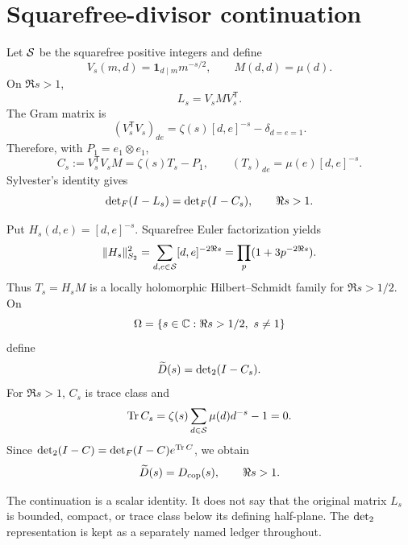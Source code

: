 \section{Squarefree-divisor continuation}

Let \(\mathcal S\) be the squarefree positive integers and define
\[
 V_s(m,d)=\mathbf 1_{d\mid m}m^{-s/2},
 \qquad M(d,d)=\mu(d).
\]
On \(\Re s>1\),
\[
 L_s=V_s M V_s^{\mathsf T}.
\]
The Gram matrix is
\[
 (V_s^{\mathsf T}V_s)_{de}
 =\zeta(s)[d,e]^{-s}-\delta_{d=e=1}.
\]
Therefore, with \(P_1=e_1\otimes e_1\),
\[
 C_s:=V_s^{\mathsf T}V_sM=\zeta(s)T_s-P_1,
 \qquad (T_s)_{de}=\mu(e)[d,e]^{-s}.
\]
Sylvester's identity gives
\[
 \operatorname{det}_{F}(I-L_s)=\operatorname{det}_{F}(I-C_s),\qquad \Re s>1.
\]

Put \(H_s(d,e)=[d,e]^{-s}\).  Squarefree Euler factorization yields
\[
 \|H_s\|_{S_2}^2
 =\sum_{d,e\in\mathcal S}[d,e]^{-2\Re s}
 =\prod_p(1+3p^{-2\Re s}).
\]
Thus \(T_s=H_sM\) is a locally holomorphic Hilbert--Schmidt family for
\(\Re s>1/2\).  On
\[
 \Omega=\{s\in\C:\Re s>1/2,\ s\ne1\}
\]
define
\[
 \widetilde D(s)=\operatorname{det}_{2}(I-C_s).
\]
For \(\Re s>1\), \(C_s\) is trace class and
\[
 \operatorname{Tr} C_s=\zeta(s)\sum_{d\in\mathcal S}\mu(d)d^{-s}-1=0.
\]
Since \(\operatorname{det}_{2}(I-C)=\operatorname{det}_{F}(I-C)e^{\operatorname{Tr} C}\), we obtain
\[
 \widetilde D(s)=D_{\mathrm{cop}}(s),\qquad \Re s>1.
\]

\begin{remark}
The continuation is a scalar identity.  It does not say that the original
matrix \(L_s\) is bounded, compact, or trace class below its defining
half-plane.  The \(\operatorname{det}_{2}\) representation is kept as a separately named
ledger throughout.
\end{remark}
